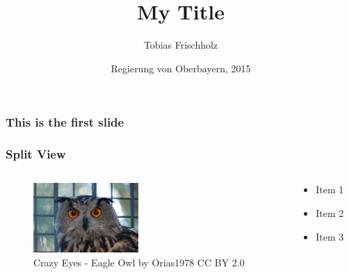 \documentclass{beamer}
\title {My Title}
\subtitle{}
\author {Tobias Frischholz}
\date {Regierung von Oberbayern, 2015}
\begin{document}
\frame{\titlepage}

\begin{frame}
	\frametitle{This is the first slide}
\end{frame}

\begin{frame}
	\frametitle{Split View}
	\begin{columns}
		\begin{column}{0.48\textwidth}
			\begin{figure}
				\includegraphics[width=4cm]{owl}
				\caption{Crazy Eyes - Eagle Owl by Orias1978 CC
				BY 2.0}
			\end{figure}

		\end{column}
		\begin{column}{0.48\textwidth}
			\begin{itemize}
				\item{Item 1}\footnotemark
				\item{Item 2}
				\item{Item 3}
			\end{itemize}
		\end{column}
	\end{columns}
\end{frame}
\end{document}
